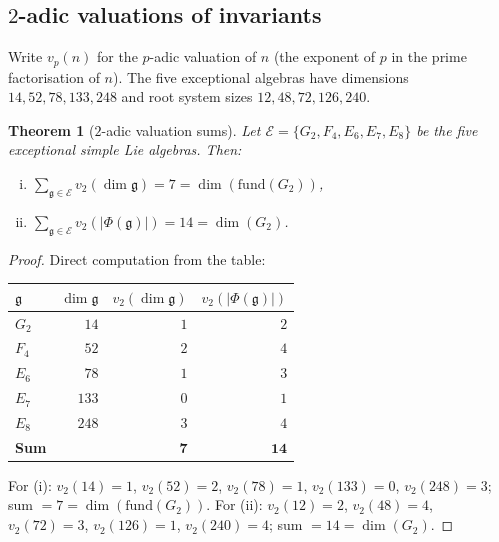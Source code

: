 \documentclass[11pt]{amsart}
\theoremstyle{plain}
\newtheorem{theorem}{Theorem}[section]
\theoremstyle{definition}
\theoremstyle{remark}
\newcommand{\fg}{\mathfrak{g}}
\renewcommand{\Phi}{\varPhi}
\begin{document}
\subsection{$2$-adic valuations of invariants}
\label{subsec:padic}

Write $v_p(n)$ for the $p$-adic valuation of $n$ (the exponent of $p$
in the prime factorisation of $n$).  The five exceptional algebras have
dimensions $14, 52, 78, 133, 248$ and root system sizes $12, 48, 72, 126, 240$.

\begin{theorem}[$2$-adic valuation sums]\label{thm:v2-sums}
  Let $\mathcal{E} = \{G_2, F_4, E_6, E_7, E_8\}$ be the five exceptional
  simple Lie algebras.  Then:
  \begin{enumerate}[(i)]
    \item $\displaystyle\sum_{\fg\in\mathcal{E}} v_2(\dim\fg) = 7 = \dim(\mathrm{fund}(G_2))$,
    \item $\displaystyle\sum_{\fg\in\mathcal{E}} v_2(|\Phi(\fg)|) = 14 = \dim(G_2)$.
  \end{enumerate}
\end{theorem}

\begin{proof}
  Direct computation from the table:
  \begin{center}
    \begin{tabular}{lrrr}
      \toprule
      $\fg$ & $\dim\fg$ & $v_2(\dim\fg)$ & $v_2(|\Phi(\fg)|)$ \\
      \midrule
      $G_2$ & $14$  & $1$ & $2$ \\
      $F_4$ & $52$  & $2$ & $4$ \\
      $E_6$ & $78$  & $1$ & $3$ \\
      $E_7$ & $133$ & $0$ & $1$ \\
      $E_8$ & $248$ & $3$ & $4$ \\
      \midrule
      \textbf{Sum} & & $\mathbf{7}$ & $\mathbf{14}$ \\
      \bottomrule
    \end{tabular}
  \end{center}
  For (i): $v_2(14)=1$, $v_2(52)=2$, $v_2(78)=1$, $v_2(133)=0$,
  $v_2(248)=3$; sum $= 7 = \dim(\mathrm{fund}(G_2))$.
  For (ii): $v_2(12)=2$, $v_2(48)=4$, $v_2(72)=3$, $v_2(126)=1$,
  $v_2(240)=4$; sum $= 14 = \dim(G_2)$.
\end{proof}
\end{document}
